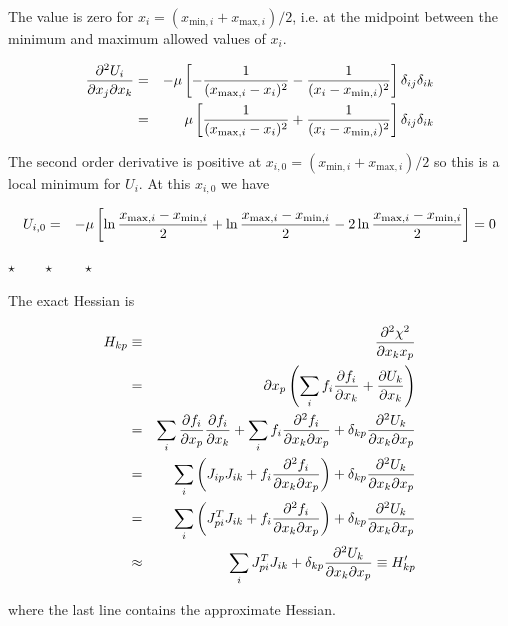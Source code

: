 \documentclass[a4paper,12pt,pdftex,onecolumn]{article}
\newcommand{\stars}{\begin{center}%
\vspace{1em plus 0.5em minus 0.5em}%
$\star \qquad \star \qquad \star$%
\vspace{1em plus 0.5em minus 0.5em}%
\end{center}}
\begin{document}
The value is zero for $x_i = (x_{\mathrm{min},i} + x_{\mathrm{max},i})/2$, i.e. at the midpoint
between the minimum and maximum allowed values of $x_i$.

\begin{eqnarray}
{\partial^2 U_i \over \partial x_j \partial x_k}
&=& - \mu \left[ - {1 \over (x_{\mathrm{max},i}-x_i)^2} - {1 \over (x_i - x_{\mathrm{min},i})^2} \right] \delta_{ij} \delta_{ik} \\
&=& \mu \left[ {1 \over (x_{\mathrm{max},i}-x_i)^2} + {1 \over (x_i - x_{\mathrm{min},i})^2} \right] \delta_{ij} \delta_{ik}
\end{eqnarray}

The second order derivative is positive at $x_{i,0} = (x_{\mathrm{min},i} + x_{\mathrm{max},i})/2$ so this is a local
minimum for $U_i$. At this $x_{i,0}$ we have

\begin{eqnarray}
U_{i,0} &=& - \mu \left[ \ln {x_{\mathrm{max},i}-x_{\mathrm{min},i}\over 2}
+ \ln {x_{\mathrm{max},i}-x_{\mathrm{min},i}\over 2}
- 2 \ln {x_{\mathrm{max},i} - x_{\mathrm{min},i} \over 2} \right]
= 0
\end{eqnarray}

\stars

The exact Hessian is

\begin{eqnarray}
H_{kp} & \equiv & {\partial^2 \chi^2 \over \partial x_k x_p}\\
&=& {\partial x_p} \left( \sum_i f_i {\partial f_i \over \partial x_k} + {\partial U_k \over \partial x_k} \right) \\
&=& \sum_i {\partial f_i \over \partial x_p} {\partial f_i \over \partial x_k}
+ \sum_i f_i {\partial^2 f_i \over \partial x_k \partial x_p}
+ \delta_{kp} {\partial^2 U_k \over \partial x_k \partial x_p}\\
&=& \sum_i \left( J_{ip} J_{ik} + f_i {\partial^2 f_i \over \partial x_k \partial x_p}\right)
+ \delta_{kp} {\partial^2 U_k \over \partial x_k \partial x_p} \\
&=& \sum_i \left( J^T_{pi} J_{ik} + f_i {\partial^2 f_i \over \partial x_k \partial x_p}\right)
+ \delta_{kp} {\partial^2 U_k \over \partial x_k \partial x_p} \\
& \approx & \sum_i J^T_{pi} J_{ik} + \delta_{kp} {\partial^2 U_k \over \partial x_k \partial x_p}
\equiv H'_{kp}
\end{eqnarray}

where the last line contains the approximate Hessian.
\end{document}
